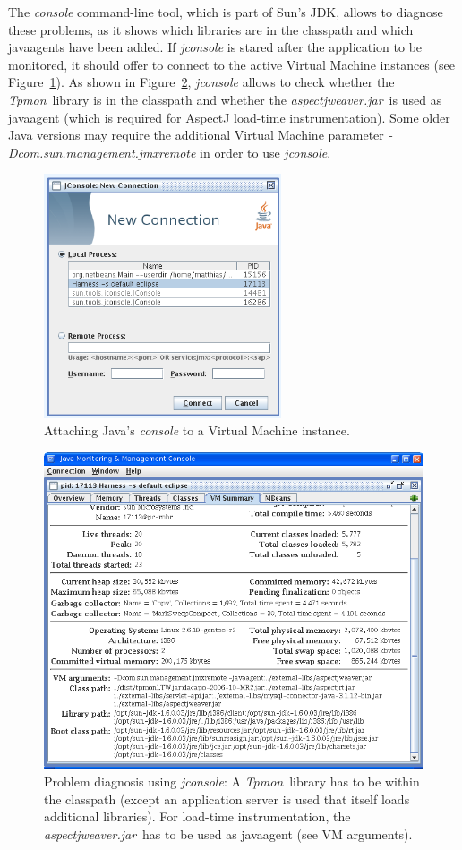 \documentclass[a4paper,12pt]{scrartcl}
\newcommand{\tpmon}{\textit{Tpmon}}
\newcommand{\aspectjweaverjar}{\textit{aspectjweaver.jar}}
\begin{document}
The \textit{console} command-line tool, which is part of Sun's JDK, allows to diagnose these problems, as it shows which libraries are in the classpath and which javaagents have been added. If \textit{jconsole} is stared after the application to be monitored, it should offer to connect to the active Virtual Machine instances (see Figure~\ref{jconsolestartup}). As shown in Figure~\ref{jconsole}, \textit{jconsole} allows to check whether the \tpmon\ library is in the classpath and whether the \aspectjweaverjar\ is used as javaagent (which is required for AspectJ load-time instrumentation). Some older Java versions may require the additional Virtual Machine parameter \textit{-Dcom.sun.management.jmxremote} in order to use \textit{jconsole}.

\begin{figure}
 \centering
 \includegraphics[width=7cm]{snapshot4b.png}
\caption{Attaching Java's \textit{console} to a Virtual Machine instance.}
 \label{jconsolestartup}
\end{figure}

\begin{figure}
 \centering
 \includegraphics[width=12cm]{snapshot5.png}
 \caption{Problem diagnosis using \textit{jconsole}: A \tpmon\ library has to be within the classpath (except an application server is used that itself loads additional libraries). For load-time instrumentation, the \aspectjweaverjar\ has to be used as javaagent (see VM arguments).}\label{jconsole}
\end{figure}
\end{document}
